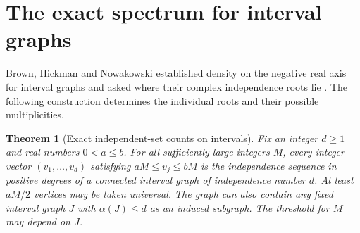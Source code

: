 \documentclass[11pt,a4paper]{article}
\newtheorem{theorem}{Theorem}[section]
\begin{document}
\section{The exact spectrum for interval graphs}
\label{sec:interval}
Brown, Hickman and Nowakowski established density on the negative real
axis for interval graphs and asked where their complex independence
roots lie \cite[Sec.~4, p.~281]{brown2004}. The following construction
determines the individual roots and their possible multiplicities.

\begin{theorem}[Exact independent-set counts on intervals]
\label{thm:interval-counts}
Fix an integer $d\ge1$ and real numbers $0<a\le b$. For all sufficiently
large integers $M$, every integer vector $(v_1,\ldots,v_d)$ satisfying
$aM\le v_j\le bM$ is the independence sequence in positive degrees of
a connected interval graph of independence number $d$.
At least $aM/2$ vertices may be taken universal. The graph can also
contain any fixed interval graph $J$ with $\alpha(J)\le d$ as an
induced subgraph. The threshold for $M$ may depend on $J$.
\end{theorem}
\end{document}
